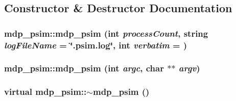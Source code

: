 \subsection{Constructor \& Destructor Documentation}
\hypertarget{classmdp__psim_aa3fd4da678b802e5f0d53787bec3f331}{
\subsubsection[{mdp\_\-psim}]{\setlength{\rightskip}{0pt plus 5cm}mdp\_\-psim::mdp\_\-psim (int {\em processCount}, \/  string {\em logFileName} = {\ttfamily \char`\"{}.psim.log\char`\"{}}, \/  int {\em verbatim} = {})}}
\label{classmdp__psim_aa3fd4da678b802e5f0d53787bec3f331}
\hypertarget{classmdp__psim_af5320c53d620c8c66f1842cd6b546bf6}{
\subsubsection[{mdp\_\-psim}]{\setlength{\rightskip}{0pt plus 5cm}mdp\_\-psim::mdp\_\-psim (int {\em argc}, \/  char $\ast$$\ast$ {\em argv})}}
\label{classmdp__psim_af5320c53d620c8c66f1842cd6b546bf6}
\hypertarget{classmdp__psim_ac6b26c66968872c6f6d71dff2bf0527f}{
\subsubsection[{$\sim$mdp\_\-psim}]{\setlength{\rightskip}{0pt plus 5cm}virtual mdp\_\-psim::$\sim$mdp\_\-psim ()}}
\label{classmdp__psim_ac6b26c66968872c6f6d71dff2bf0527f}



